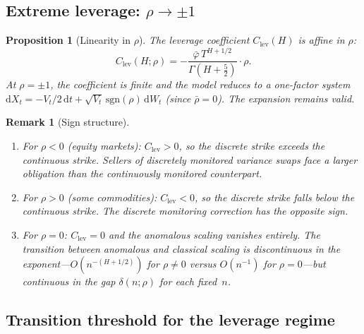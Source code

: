 \documentclass[12pt]{article}
\newtheorem{proposition}[theorem]{Proposition}
\newtheorem{remark}{Remark}
\theoremstyle{definition}
\newcommand{\dd}{\mathrm{d}}
\begin{document}
\subsection{Extreme leverage: $\rho \to \pm 1$}
\label{sec:rho-boundary}

\begin{proposition}[Linearity in $\rho$]\label{prop:rho-boundary}
The leverage coefficient $C_{\mathrm{lev}}(H)$ is affine in $\rho$:
\[
  C_{\mathrm{lev}}(H;\rho)
  = -\frac{\bar\varphi\,T^{H+1/2}}{\Gamma(H+\tfrac52)}\cdot\rho.
\]
At $\rho = \pm 1$, the coefficient is finite and the model reduces
to a one-factor system
$\dd X_t = -V_t/2\,\dd t + \sqrt{V_t}\,\mathrm{sgn}(\rho)\,\dd W_t$
(since $\bar\rho = 0$).
The expansion remains valid.
\end{proposition}

\begin{remark}[Sign structure]
\leavevmode
\begin{enumerate}[label=(\alph*)]
\item For $\rho < 0$ (equity markets):
  $C_{\mathrm{lev}} > 0$, so the discrete strike \emph{exceeds} the
  continuous strike. Sellers of discretely monitored variance swaps
  face a larger obligation than the continuously monitored counterpart.

\item For $\rho > 0$ (some commodities):
  $C_{\mathrm{lev}} < 0$, so the discrete strike falls \emph{below}
  the continuous strike. The discrete monitoring correction has the
  opposite sign.

\item For $\rho = 0$:
  $C_{\mathrm{lev}} = 0$ and the anomalous scaling vanishes entirely.
  The transition between anomalous and classical scaling is discontinuous
  in the \emph{exponent}---$O(n^{-(H+1/2)})$ for $\rho \neq 0$ versus
  $O(n^{-1})$ for $\rho = 0$---but continuous in the gap
  $\delta(n;\rho)$ for each fixed~$n$.
\end{enumerate}
\end{remark}

\subsection{Transition threshold for the leverage regime}
\label{sec:transition}
\end{document}
